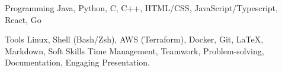 

\begin{cvskills}

  \cvskill
    {Programming} %
    {
      Java,
      Python, 
      C,
      C++, 
      HTML/CSS, 
      JavaScript/Typescript,
      React,
      Go
    } %

  \cvskill
    {Tools} %
    {
      Linux, 
      Shell (Bash/Zsh), 
      AWS (Terraform),
      Docker,
      Git,
      \LaTeX,
      Markdown, 
    } %
  \cvskill
    {Soft Skills} %
    {
      Time Management, 
      Teamwork, 
      Problem-solving, 
      Documentation, 
      Engaging Presentation.
    } %

\end{cvskills}
